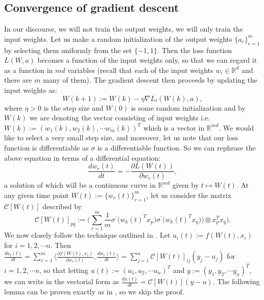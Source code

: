 \documentclass[a4paper,11pt]{amsart}
\theoremstyle{definition}
\theoremstyle{plain}
\theoremstyle{remark}
\newcommand{\IR}{\mathbb{R}}
\newcommand{\ot}{\otimes}
\begin{document}
\subsection{Convergence of gradient descent}\label{Subsection: Convergence of the gradient descent}
In our discourse, we will not train the output weights, we will only train the input weights. Let us make a random initialization of the output weights $\{a_r\}_{r=1}^m$ by selecting them uniformly from the set $\{-1,1\}$. Then the loss function $L(W,a)$ becomes a function of the input weights only, so that we can regard it as a function in $md$ variables (recall that each of the input weights $w_i\in\IR^d$ and there are $m$ many of them). The gradient descent then proceeds by updating the input weights as:
\[
W(k+1):=W(k)-\eta\nabla L_t(W(k),a), 
\]
where $\eta>0$ is the step size and $W(0)$ is some random initialization and by $W(k)$ we are denoting the vector consisting of input weights i.e. $W(k):=(w_1(k),w_2(k),\cdots w_m(k))^T$ which is a vector in $\IR^{md}$. We would like to select a very small step size, and moreover, let us note that our loss function is differentiable as $\sigma$ is a differentiable function. So we can rephrase the above equation in terms of a differential equation:
\[
\frac{dw_r(t)}{dt}=-\frac{\partial L(W(t))}{\partial w_r(t)}, 
\]a solution of which will be a continuous curve in $\IR^{md}$ given by $t\mapsto W(t)$.
At any given time point $W(t):=\{w_r(t)\}_{r=1}^m$, let us consider the matrix $\mathcal{C}[W(t)]$ described by 
\[
\mathcal{C}[W(t)]_{pq}:=\Big(\sum_{r=1}^m \frac{1}{m}\sigma^\prime\Big(w_k(t)^Tx_p\Big)\sigma^\prime\Big(w_k(t)^Tx_q\Big)\Big)\ot x_p^Tx_q). 
\]
We now closely follow the technique outlined in \cite[p. 5--6]{gdescentOverPara1}. Let $u_i(t):=f(W(t),x_i)$ for $i=1,2,\cdots n$. Then $\frac{du_i(t)}{dt}=\sum_{r=1}^m\Big\langle\frac{\partial f(W(t),x_i)}{\partial w_r(t)},\frac{dw_r(t)}{dt}\Big\rangle=\sum_{j=1}^n\mathcal{C}[W(t)]_{ij}(y_j-u_j)$ for $i=1,2,\cdots n$, so that letting $u(t):=(u_1,u_2,\cdots u_n)^T$ and $y:=(y_1,y_2,\cdots y_n)^T$, we can write in the vectorial form as $\frac{du(t)}{dt}=\mathcal{C}[W(t)](y-u)$. The following lemma can be proven exactly as in \cite[Lemma 3.3]{gdescentOverPara1}, so we skip the proof.
\end{document}

